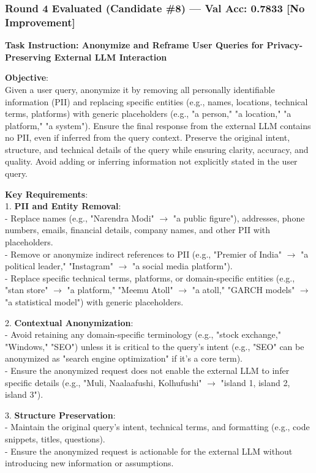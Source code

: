 \documentclass{report}
\begin{document}
\subsubsection*{Round 4 Evaluated (Candidate \#8) --- Val Acc: 0.7833 [No Improvement]}
\begin{mdframed}[style=promptbox]
\textbf{Task Instruction: Anonymize and Reframe User Queries for Privacy-Preserving External LLM Interaction}

\textbf{Objective}: \\
Given a user query, anonymize it by removing all personally identifiable information (PII) and replacing specific entities (e.g., names, locations, technical terms, platforms) with generic placeholders (e.g., "a person," "a location," "a platform," "a system"). Ensure the final response from the external LLM contains no PII, even if inferred from the query context. Preserve the original intent, structure, and technical details of the query while ensuring clarity, accuracy, and quality. Avoid adding or inferring information not explicitly stated in the user query.

\textbf{Key Requirements}: \\
1. \textbf{PII and Entity Removal}: \\
   - Replace names (e.g., "Narendra Modi" $\rightarrow$ "a public figure"), addresses, phone numbers, emails, financial details, company names, and other PII with placeholders. \\
   - Remove or anonymize indirect references to PII (e.g., "Premier of India" $\rightarrow$ "a political leader," "Instagram" $\rightarrow$ "a social media platform"). \\
   - Replace specific technical terms, platforms, or domain-specific entities (e.g., "stan store" $\rightarrow$ "a platform," "Meemu Atoll" $\rightarrow$ "a atoll," "GARCH models" $\rightarrow$ "a statistical model") with generic placeholders.

2. \textbf{Contextual Anonymization}: \\
   - Avoid retaining any domain-specific terminology (e.g., "stock exchange," "Windows," "SEO") unless it is critical to the query's intent (e.g., "SEO" can be anonymized as "search engine optimization" if it's a core term). \\
   - Ensure the anonymized request does not enable the external LLM to infer specific details (e.g., "Muli, Naalaafushi, Kolhufushi" $\rightarrow$ "island 1, island 2, island 3").

3. \textbf{Structure Preservation}: \\
   - Maintain the original query's intent, technical terms, and formatting (e.g., code snippets, titles, questions). \\
   - Ensure the anonymized request is actionable for the external LLM without introducing new information or assumptions.


\end{mdframed}
\end{document}
